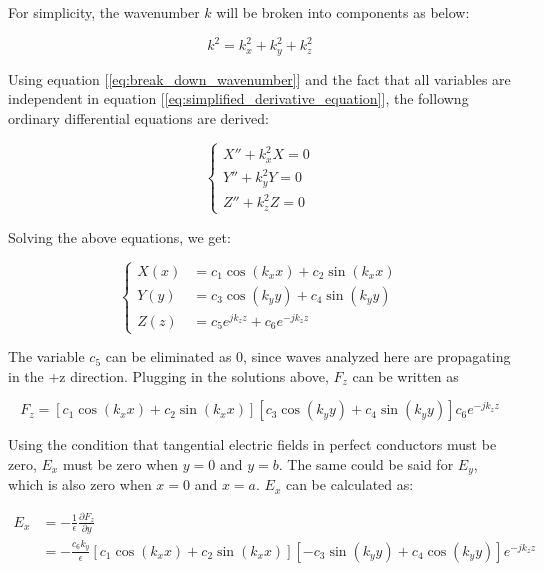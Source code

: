 \documentclass[a4paper,12pt]{report}
\begin{document}
For simplicity, the wavenumber $k$ will be broken into components as below:

\begin{equation} \label{eq:break_down_wavenumber}
  k^2 = k_x^2 + k_y^2 + k_z^2
\end{equation}

Using equation [\ref{eq:break_down_wavenumber}] and the fact that all variables are
independent in equation [\ref{eq:simplified_derivative_equation}],
the followng ordinary differential equations are derived:

\begin{equation} \label{eq:three_ordinary}
  \left\{
  \begin{alignedat}{3}
    X'' + k_x^2 X = 0 \\
    Y'' + k_y^2 Y = 0 \\
    Z'' + k_z^2 Z = 0
  \end{alignedat}
  \right.
\end{equation}

Solving the above equations, we get:

\begin{equation} \label{eq:three_solved_ordinary}
  \left\{
  \begin{alignedat}{3}
    X(x) &= c_1 \cos (k_x x) + c_2 \sin (k_x x) \\
    Y(y) &= c_3 \cos (k_y y) + c_4 \sin (k_y y) \\
    Z(z) &= c_5 e^{j k_z z} + c_6 e^{-j k_z z}
  \end{alignedat}
  \right.
\end{equation}

The variable $c_5$ can be eliminated as $0$,
since waves analyzed here are propagating in the +z direction.
Plugging in the solutions above, $F_z$ can be written as

\begin{equation}
  F_z = [c_1 \cos (k_x x) + c_2 \sin (k_x x)][c_3 \cos (k_y y) + c_4 \sin (k_y y)]c_6 e^{-j k_z z}
\end{equation}

Using the condition that tangential electric fields in perfect conductors must be zero,
$E_x$ must be zero when $y=0$ and $y=b$.
The same could be said for $E_y$,
which is also zero when $x=0$ and $x=a$.
$E_x$ can be calculated as:

\begin{equation}
  \begin{split}
    E_x &= -\frac{1}{\epsilon} \frac{\partial F_z}{\partial y} \\
        &= - \frac{c_6 k_y}{\epsilon}[c_1 \cos (k_x x) + c_2 \sin (k_x x)][-c_3 \sin (k_y y) + c_4 \cos(k_y y)]e^{-jk_z z}
  \end{split}
\end{equation}
\end{document}
